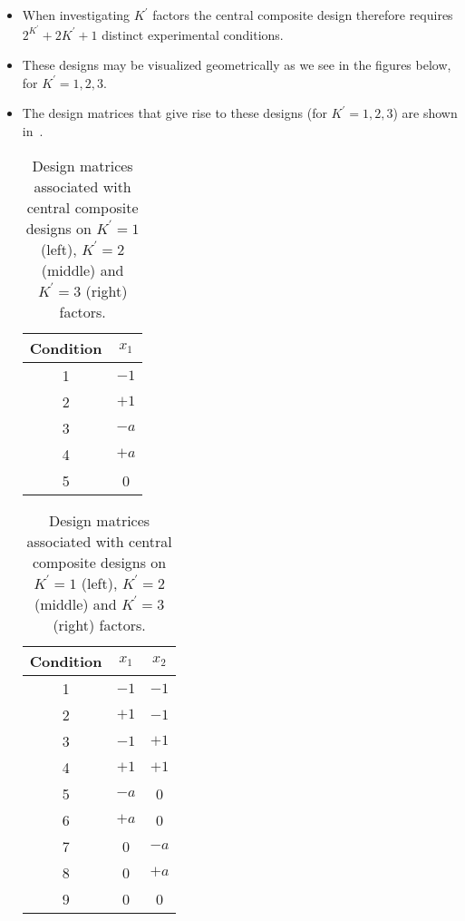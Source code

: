 \begin{itemize}
\begin{enumerate}[i.]
          \end{enumerate}
    \item When investigating $ K^\prime $ factors the central composite design therefore requires $ 2^{K^\prime}+2K^\prime+1 $ distinct experimental conditions.
    \item These designs may be visualized geometrically as we see in the figures below, for $ K^\prime=1,2,3 $.
    \item The design matrices that give rise to these designs (for $ K^\prime=1,2,3 $) are shown in~.
          \begin{table}[!htbp]
              \centering
              \caption{Design matrices associated with central composite designs on $ K^\prime=1 $ (left), $ K^\prime=2 $ (middle) and $ K^\prime=3 $ (right) factors.}\label{tab:exampledesigns}
              \begin{tabular}{cc}
                  \toprule Condition & $x_{1}$ \\
                  \midrule 1         & $-1$    \\
                  2                  & $+1$    \\
                  3                  & $-a$    \\
                  4                  & $+a$    \\
                  5                  & 0       \\
                  \bottomrule
              \end{tabular}\hfill
              \begin{tabular}{ccc}
                  \toprule Condition & $x_{1}$ & $x_{2}$ \\
                  \midrule 1         & $-1$    & $-1$    \\
                  2                  & $+1$    & $-1$    \\
                  3                  & $-1$    & $+1$    \\
                  4                  & $+1$    & $+1$    \\
                  5                  & $-a$    & 0       \\
                  6                  & $+a$    & 0       \\
                  7                  & 0       & $-a$    \\
                  8                  & 0       & $+a$    \\
                  9                  & 0       & 0       \\

\end{tabular}
\end{table}
\end{itemize}
